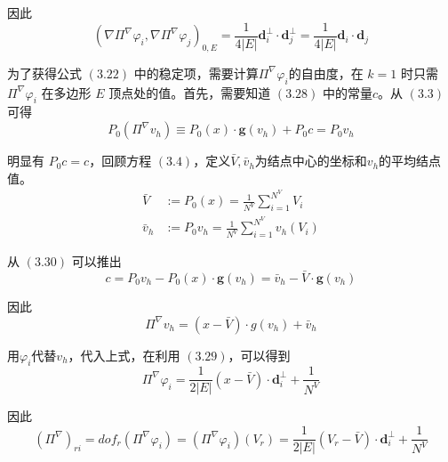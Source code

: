 因此 \\
\begin{equation*}
(\nabla\Pi^{\nabla} \varphi_i,\nabla\Pi^{\nabla} \varphi_j)_{0,E} = \frac{1}{4|E|} \mathbf{d}_i^\perp \cdot \mathbf{d}_j^\perp = \frac{1}{4|E|} \mathbf{d}_i \cdot \mathbf{d}_j
\end{equation*}

为了获得公式 $(3.22)$ 中的稳定项，需要计算$\Pi^{\nabla}\varphi_i$的自由度，在 $k=1$ 时只需 $\Pi^{\nabla}\varphi_i$ 在多边形 $E$ 顶点处的值。首先，需要知道 $(3.28)$ 中的常量$c$。从 $(3.3)$ 可得 \\
\begin{equation}
P_0(\Pi^{\nabla}v_h) \equiv P_0(x) \cdot \mathbf g(v_h) + P_0c = P_0 v_h
\end{equation}

明显有 $P_0c=c$，回顾方程 $(3.4)$，定义$\bar{V}, \bar{v}_h$为结点中心的坐标和$v_h$的平均结点值。\\
\begin{equation*}
\begin{aligned}
\bar{V} &:= P_0(x) = \frac{1}{N^V} \sum_{i=1}^{N^V}V_i\\
\bar{v}_h &:= P_0v_h = \frac{1}{N^V}\sum_{i=1}^{N^V}v_h(V_i)
\end{aligned}
\end{equation*}

从 $(3.30)$ 可以推出 \\
\begin{equation*}
c= P_0 v_h - P_0(x) \cdot \mathbf g(v_h) =\bar{v}_h - \bar{V}\cdot \mathbf g(v_h)
\end{equation*}

因此 \\
\begin{equation*}
\Pi^{\nabla}v_h = (x-\bar{V}) \cdot g(v_h) + \bar{v}_h
\end{equation*}

用$\varphi_i$代替$v_h$，代入上式，在利用 $(3.29)$，可以得到 \\
\begin{equation*}
\Pi^{\nabla}\varphi_i = \frac{1}{2|E|} (x-\bar{V})\cdot \mathbf{d}_i^\perp + \frac{1}{N^V} 
\end{equation*}

因此 \\
\begin{equation}
(\Pi^{\nabla})_{ri} = dof_r(\Pi^{\nabla} \varphi_i) = (\Pi^{\nabla} \varphi_i)(V_r) =  \frac{1}{2|E|} (V_r-\bar{V})\cdot\mathbf{d}_i^\perp + \frac{1}{N^V}
\end{equation}

